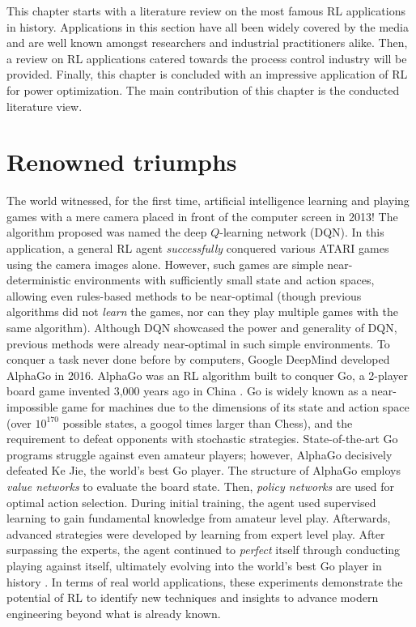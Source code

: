 %
%
% 

This chapter starts with a literature review on the most famous RL applications in history.  Applications in this section have all been widely covered by the media and are well known amongst researchers and industrial practitioners alike.  Then, a review on RL applications catered towards the process control industry will be provided. Finally, this chapter is concluded with an impressive application of RL for power optimization. The main contribution of this chapter is the conducted literature view.

\section{Renowned triumphs}
The world witnessed, for the first time, artificial intelligence learning and playing games with a mere camera placed in front of the computer screen \cite{dqn1, dqn2} in 2013! The algorithm proposed was named the deep $Q$-learning network (DQN). In this application, a general RL agent \textit{successfully} conquered various ATARI games using the camera images alone.  However, such games are simple near-deterministic environments with sufficiently small state and action spaces, allowing even rules-based methods to be near-optimal (though previous algorithms did not \textit{learn} the games, nor can they play multiple games with the same algorithm). Although DQN showcased the power and generality of DQN, previous methods were already near-optimal in such simple environments. To conquer a task never done before by computers, Google DeepMind developed AlphaGo in 2016.  AlphaGo was an RL algorithm built to conquer Go, a 2-player board game invented 3,000 years ago in China \cite{alphago1, alphago2}. Go is widely known as a near-impossible game for machines due to the dimensions of its state and action space (over $10^{170}$ possible states, a googol times larger than Chess), and the requirement to defeat opponents with stochastic strategies. State-of-the-art Go programs struggle against even amateur players; however, AlphaGo decisively defeated Ke Jie, the world's best Go player. The structure of AlphaGo employs \textit{value networks} to evaluate the board state. Then, \textit{policy networks} are used for optimal action selection.  During initial training, the agent used supervised learning to gain fundamental knowledge from amateur level play.  Afterwards, advanced strategies were developed by learning from expert level play.  After surpassing the experts, the agent continued to \textit{perfect} itself through conducting playing against itself, ultimately evolving into the world's best Go player in history \cite{alphago1, alphago2}. In terms of real world applications, these experiments demonstrate the potential of RL to identify new techniques and insights to advance modern engineering beyond what is already known.

